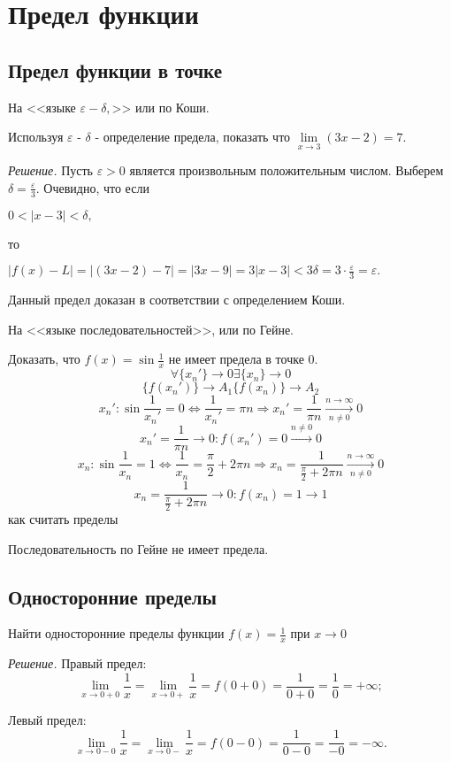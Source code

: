 \documentclass[14pt]{extreport}
\begin{document}
\chapter{Предел функции}

\section{Предел функции в точке}
\begin{example}

На <<языке $\varepsilon - \delta,$>> или по Коши.

Используя $\varepsilon$ - $\delta$ - определение предела, показать что $\lim\limits_{x \to 3}(3x-2)=7.$

\emph{Решение.}
 Пусть $\varepsilon>0$ является произвольным положительным числом. Выберем $\delta=\frac{\varepsilon}{3}.$ Очевидно, что если 

$0<|x-3|<\delta,$

 то

$|f(x)-L|=|(3x-2)-7|=|3x-9|=3|x-3|<3\delta=3\cdot\frac{\varepsilon}{3}=\varepsilon.$

Данный предел доказан в соответствии с определением Коши.

\end{example}

\begin{example}
На <<языке последовательностей>>, или по Гейне.

Доказать, что $f(x)=\sin\frac{1}{x}$ не имеет предела в точке $0$.
$$\forall\{x_n'\}\rightarrow 0\exists\{x_n\} \rightarrow0$$
$$\{f(x_n')\}\rightarrow A_1\{f(x_n)\}\rightarrow A_2$$
$$x_n':\sin\frac{1}{x_n'}=0\Leftrightarrow\frac{1}{x_n'}=\pi n\Longrightarrow x_n'=\frac{1}{\pi n} \xrightarrow[n\neq 0]{n\rightarrow \infty}0$$
$$x_n'=\frac{1}{\pi n}\rightarrow0:f(x_n')=0\xrightarrow{n\neq0}0$$
$$x_n:\sin\frac{1}{x_n}=1\Leftrightarrow\frac{1}{x_n}=\frac{\pi}{2}+2\pi n \Longrightarrow x_n=\frac{1}{\frac{\pi}{2}+2\pi n}\xrightarrow[n\neq0]{n\rightarrow\infty}0$$
$$x_n=\frac{1}{\frac{\pi}{2}+2\pi n}\rightarrow0:f(x_n)=1\rightarrow1$$как считать пределы

Последовательность по Гейне не имеет предела.
\end{example}

\section{Односторонние пределы}

\begin{example}
Найти односторонние пределы функции $f(x)=\frac{1}{x}$ при $x\rightarrow0$

\emph{Решение.} Правый предел:
$$\lim\limits_{x\to 0+0}\frac{1}{x}=\lim\limits_{x\to 0+}\frac{1}{x}=f(0+0)=\frac{1}{0+0}=\frac{1}{0}=+\infty;$$

Левый предел: 
$$\lim\limits_{x\to 0-0}\frac{1}{x}=\lim\limits_{x\to 0-}\frac{1}{x}=f(0-0)=\frac{1}{0-0}=\frac{1}{-0}=-\infty.$$
\end{example}
\end{document}
